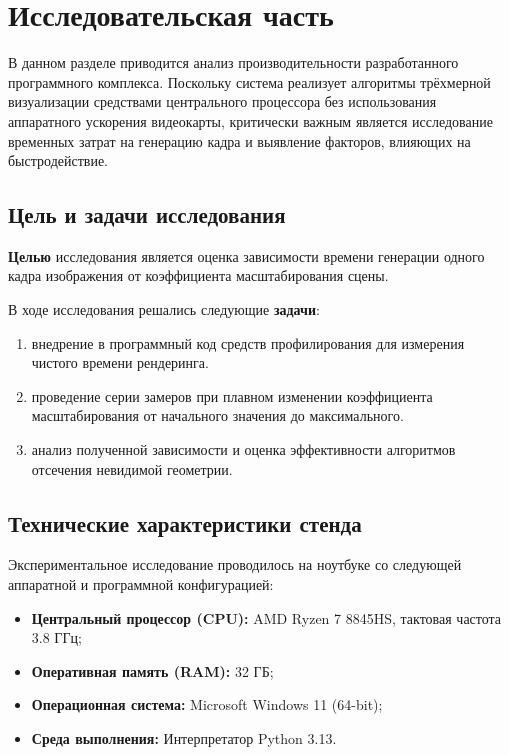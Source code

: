 \chapter{Исследовательская часть}

В данном разделе приводится анализ производительности разработанного программного комплекса. Поскольку система реализует алгоритмы трёхмерной визуализации средствами центрального процессора без использования аппаратного ускорения видеокарты, критически важным является исследование временных затрат на генерацию кадра и выявление факторов, влияющих на быстродействие.

\section{Цель и задачи исследования}

\textbf{Целью} исследования является оценка зависимости времени генерации одного кадра изображения от коэффициента масштабирования сцены.

В ходе исследования решались следующие \textbf{задачи}:
\begin{enumerate}
	\item внедрение в программный код средств профилирования для измерения чистого времени рендеринга.
	\item проведение серии замеров при плавном изменении коэффициента масштабирования от начального значения до максимального.
	\item анализ полученной зависимости и оценка эффективности алгоритмов отсечения невидимой геометрии.
\end{enumerate}

\section{Технические характеристики стенда}

Экспериментальное исследование проводилось на ноутбуке со следующей аппаратной и программной конфигурацией:

\begin{itemize}
	\item \textbf{Центральный процессор (CPU):} AMD Ryzen 7 8845HS, тактовая частота 3.8 ГГц;
	\item \textbf{Оперативная память (RAM):} 32 ГБ;
	\item \textbf{Операционная система:} Microsoft Windows 11 (64-bit);
	\item \textbf{Среда выполнения:} Интерпретатор Python 3.13.
\end{itemize}

